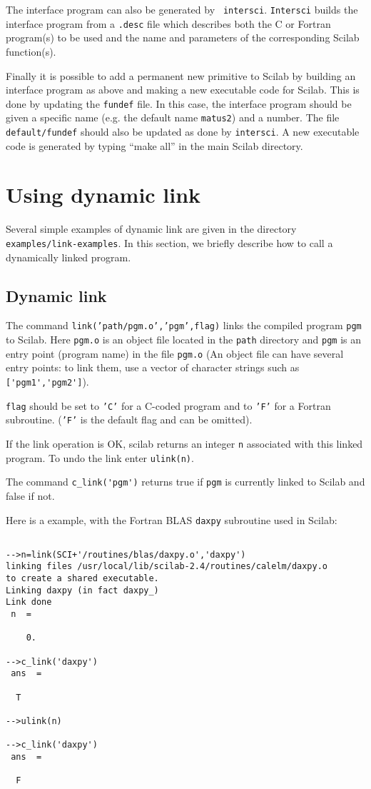 The interface program can also be generated by {\tt
intersci}. {\tt Intersci} builds the interface
program from a {\tt .desc} file which describes both the C or 
Fortran program(s) to be used and the name and parameters of
the corresponding Scilab function(s). 

Finally  it is possible to add a permanent new primitive to Scilab
by building an interface program as above and making a new executable
code for Scilab. This is done by updating the {\tt fundef}
file. In this case, the interface program should be given a specific 
name (e.g. the default name {\tt matus2}) and a number. The file 
{\tt default/fundef} should also be updated as done by {\tt intersci}.
A new executable code is generated by typing ``make all''
in the main Scilab directory.

\section{Using dynamic link}
Several simple examples of dynamic link are  given in the directory
{\tt examples/link-examples}. In this section, we briefly describe 
how to call a dynamically linked program. 
\subsection{Dynamic link}
\label{dynamiclink}
The command {\tt link('path/pgm.o','pgm',flag)}
links the compiled program {\tt pgm} to Scilab.
Here {\tt pgm.o} is an object file located in the {\tt path}
directory and {\tt pgm} is an entry point (program name) in the file {\tt pgm.o}
(An object file can have several entry points: to link them, use a vector of
character strings such as \verb!['pgm1','pgm2']!).

{\tt flag} should be set to {\tt 'C'} for a C-coded program
and to {\tt 'F'} for a Fortran subroutine. ({\tt 'F'} is
the default flag and can be omitted).

If the link operation is OK, scilab returns an integer {\tt n} associated
with this linked program. To undo the link enter {\tt ulink(n)}.

The command \verb!c_link('pgm')! returns true if {\tt pgm} is
currently linked to Scilab and false if not.

\noindent
Here is a example, with the Fortran BLAS {\tt daxpy} subroutine 
used in Scilab:
\begin{verbatim}

-->n=link(SCI+'/routines/blas/daxpy.o','daxpy')
linking files /usr/local/lib/scilab-2.4/routines/calelm/daxpy.o
to create a shared executable.
Linking daxpy (in fact daxpy_)
Link done
 n  =
 
    0.  
 
-->c_link('daxpy')
 ans  =
 
  T  

-->ulink(n)
 
-->c_link('daxpy')
 ans  =
 
  F  
\end{verbatim}


